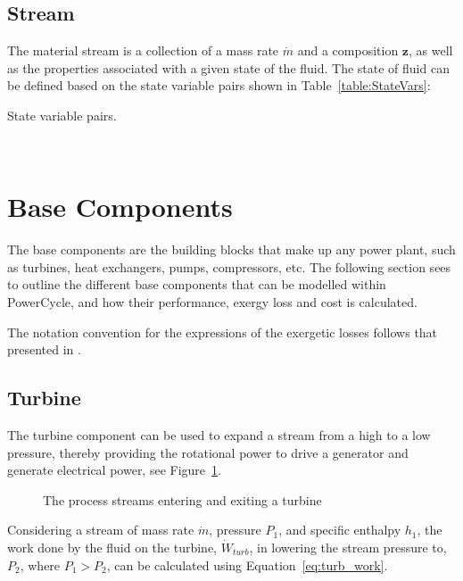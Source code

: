     \subsection{Stream}
        The material stream is a collection of a mass rate \(\Dot{m}\) and a composition \(\mathbf{z}\), as well as the properties associated with a given state of the fluid. The state of fluid can be defined based on the state variable pairs shown in Table~\ref{table:StateVars}:

        \begin{table}[H]
            \caption{State variable pairs.}
            \centering
            \label{table:StateVars}
            
            \\[10pt]
        \end{table}

\section{Base Components}
    \label{sec:prosim_components}
    The base components are the building blocks that make up any power plant, such as turbines, heat exchangers, pumps, compressors, etc. The following section sees to outline the different base components that can be modelled within PowerCycle, and how their performance, exergy loss and cost is calculated.

    The notation convention for the expressions of the exergetic losses follows that presented in .
    
    \subsection{Turbine}
        \label{sec:prosim_pwrcyc_turbines}
        The turbine component can be used to expand a stream from a high to a low pressure, thereby providing the rotational power to drive a generator and generate electrical power, see Figure~\ref{fig:turbine}.

        \begin{figure}[H]
            \centering
            
            \caption{The process streams entering and exiting a turbine}
            \label{fig:turbine}
        \end{figure}

        Considering a stream of mass rate \(\Dot{m}\), pressure \(P_1\), and specific enthalpy \(h_1\), the work done by the fluid on the turbine, \(\Dot{W}_{turb}\), in lowering the stream pressure to, \(P_2\), where \(P_1 > P_2\), can be calculated using Equation~\eqref{eq:turb_work}. 

